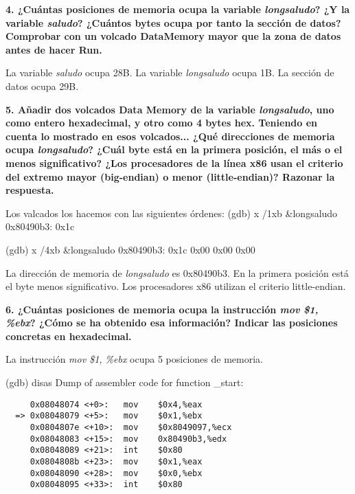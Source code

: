 \documentclass{article}
\begin{document}
  \begin{flushleft}
    \textbf{4. ¿Cuántas posiciones de memoria ocupa la variable \textit{longsaludo}?
    ¿Y la variable \textit{saludo}? ¿Cuántos bytes ocupa por tanto la sección de datos?
    Comprobar con un volcado Data\textrightarrow Memory mayor que la zona de datos
    antes de hacer Run.} \break

    La variable \textit{saludo} ocupa 28B. \break
    La variable \textit{longsaludo} ocupa 1B. \break
    La sección de datos ocupa 29B.
  \end{flushleft}

  \begin{flushleft}
    \textbf{5. Añadir dos volcados Data \textrightarrow Memory de la variable \textit{longsaludo},
    uno como entero hexadecimal, y otro como 4 bytes hex. Teniendo en cuenta lo mostrado en esos volcados...
    ¿Qué direcciones de memoria ocupa \textit{longsaludo}? ¿Cuál byte está en la primera
    posición, el más o el menos significativo? ¿Los procesadores de la línea x86 usan
    el criterio del extremo mayor (big-endian) o menor (little-endian)? Razonar la respuesta.} \break

    Los valcados los hacemos con las siguientes órdenes:  \break
    (gdb) x /1xb \&longsaludo \break
    0x80490b3:	0x1c \break \break

    (gdb) x /4xb \&longsaludo \break
    0x80490b3:	0x1c	0x00	0x00	0x00 \break

    La dirección de memoria de \textit{longsaludo} es 0x80490b3. \break
    En la primera posición está el byte menos significativo. \break
    Los procesadores x86 utilizan el criterio little-endian.
  \end{flushleft}

  \begin{flushleft}
    \textbf{6. ¿Cuántas posiciones de memoria ocupa la instrucción \textit{mov \$1, \%ebx}?
    ¿Cómo se ha obtenido esa información? Indicar las posiciones concretas en hexadecimal.} \break

    La instrucción \textit{mov \$1, \%ebx} ocupa 5 posiciones de memoria.

    (gdb) disas \break
    Dump of assembler code for function \_start:
  \end{flushleft}

  \begin{lstlisting}
     0x08048074 <+0>:	mov    $0x4,%eax
  => 0x08048079 <+5>:	mov    $0x1,%ebx
     0x0804807e <+10>:	mov    $0x8049097,%ecx
     0x08048083 <+15>:	mov    0x80490b3,%edx
     0x08048089 <+21>:	int    $0x80
     0x0804808b <+23>:	mov    $0x1,%eax
     0x08048090 <+28>:	mov    $0x0,%ebx
     0x08048095 <+33>:	int    $0x80
  \end{lstlisting}
\end{document}
